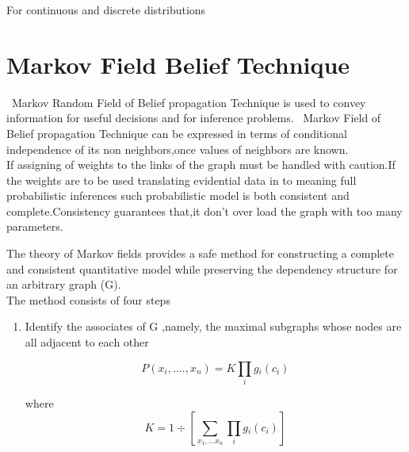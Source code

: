 For continuous and discrete distributions


\section{Markov Field Belief Technique }
\ Markov  Random Field of Belief propagation Technique is used to convey information for useful decisions and for  inference problems.
\ Markov  Field of Belief propagation Technique can be expressed in terms of conditional independence of its non neighbors,once values of neighbors  are known.
\\ If assigning of weights to the links of the graph must be handled with caution.If the weights are to be used translating evidential data in to meaning full probabilistic inferences such probabilistic model is both consistent and complete.Consistency guarantees that,it don't over load the graph with too many parameters.


The theory of Markov fields provides a safe method for constructing a complete and consistent quantitative model while preserving the dependency structure for an arbitrary graph (G).\\


The method consists of four steps
\begin{enumerate}
  \item Identify the associates of G ,namely, the maximal subgraphs whose nodes are all adjacent to each other


\begin{equation}\label{}
    P( x{_i},....,x{_n}) =K\prod_{i}g{_i}(c{_i})
\end{equation}

where
 \begin{equation}\label{}
    K= 1\div[\sum_{x{_1},...x{_n}}\prod_{i}g{_i}(c{_i})]
 \end{equation}

\end{enumerate}













